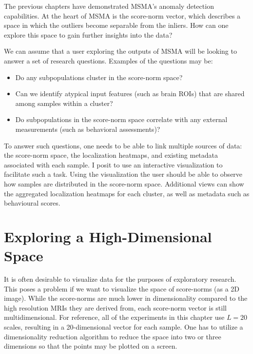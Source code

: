 The previous chapters have demonstrated MSMA's anomaly detection capabilities. At the heart of MSMA is the score-norm vector, which describes a space in which the outliers become separable from the inliers. How can one explore this space to gain further insights into the data?

We can assume that a user exploring the outputs of MSMA will be looking to answer a set of research questions. Examples of the questions may be:
\begin{itemize}
    \item Do any subpopulations cluster in the score-norm space?
    \item Can we identify atypical input features (such as brain ROIs)  that are shared among samples within a cluster?
    \item Do subpopulations in the score-norm space correlate with any external measurements (such as behavioral assessments)?
\end{itemize}

To answer such questions, one needs to be able to link multiple sources of data: the score-norm space, the localization heatmaps, and existing metadata associated with each sample. I posit to use an interactive visualization to facilitate such a task.
Using the visualization the user should be able to observe how samples are distributed in the score-norm space. Additional views can show the aggregated localization heatmaps for each cluster, as well as metadata such as behavioural scores.


\section{Exploring a High-Dimensional Space}

It is often desirable to visualize data for the purposes of exploratory research. This poses a problem if we want to visualize the space of score-norms (as a 2D image). While the score-norms are much lower in dimensionality compared to the high resolution MRIs they are derived from, each score-norm vector is still multidimensional. For reference, all of the experiments in this chapter use $L=20$ scales, resulting in a 20-dimensional vector for each sample. One has to utilize a dimensionality reduction algorithm to reduce the space into two or three dimensions so that the points may be plotted on a screen.

